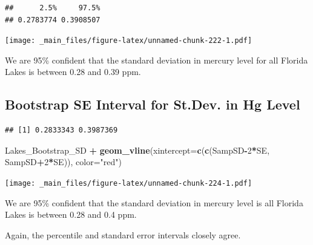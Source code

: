 \documentclass[]{book}
\newenvironment{Shaded}{\begin{snugshade}}{\end{snugshade}}
\newcommand{\KeywordTok}[1]{\textcolor[rgb]{0.13,0.29,0.53}{\textbf{#1}}}
\newcommand{\DataTypeTok}[1]{\textcolor[rgb]{0.13,0.29,0.53}{#1}}
\newcommand{\DecValTok}[1]{\textcolor[rgb]{0.00,0.00,0.81}{#1}}
\newcommand{\StringTok}[1]{\textcolor[rgb]{0.31,0.60,0.02}{#1}}
\newcommand{\OperatorTok}[1]{\textcolor[rgb]{0.81,0.36,0.00}{\textbf{#1}}}
\newcommand{\NormalTok}[1]{#1}
\begin{document}
\begin{verbatim}
##      2.5%     97.5% 
## 0.2783774 0.3908507
\end{verbatim}

\texttt{[image: \_main\_files/figure-latex/unnamed-chunk-222-1.pdf]}

We are 95\% confident that the standard deviation in mercury level for
all Florida Lakes is between 0.28 and 0.39 ppm.

\subsection{Bootstrap SE Interval for St.Dev. in Hg
Level}\label{bootstrap-se-interval-for-st.dev.-in-hg-level}

\begin{Shaded}
\end{Shaded}

\begin{verbatim}
## [1] 0.2833343 0.3987369
\end{verbatim}

\begin{Shaded}
\begin{Highlighting}[]
\NormalTok{Lakes_Bootstrap_SD  }\OperatorTok{+}\StringTok{ }\KeywordTok{geom_vline}\NormalTok{(}\DataTypeTok{xintercept=}\KeywordTok{c}\NormalTok{(}\KeywordTok{c}\NormalTok{(SampSD}\OperatorTok{-}\DecValTok{2}\OperatorTok{*}\NormalTok{SE, SampSD}\OperatorTok{+}\DecValTok{2}\OperatorTok{*}\NormalTok{SE)), }\DataTypeTok{color=}\StringTok{"red"}\NormalTok{) }
\end{Highlighting}
\end{Shaded}

\texttt{[image: \_main\_files/figure-latex/unnamed-chunk-224-1.pdf]}

We are 95\% confident that the standard deviation in mercury level is
all Florida Lakes is between 0.28 and 0.4 ppm.

Again, the percentile and standard error intervals closely agree.
\end{document}
